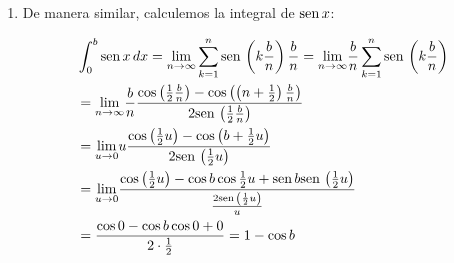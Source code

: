 \begin{enumerate}[leftmargin=1.2em,   itemindent=0pt,       labelwidth=\labelwidth,labelsep=0.5em,]
{\small
\begin{align*}
&=\underset{u\rightarrow 0}{\lim }u\frac{\sen\left( b+\frac{1}{2}u\right)
-\sen\left( \frac{1}{2}u\right) }{2\sen\left( \frac{1}{2}u\right) }\\&
=\underset{u\rightarrow 0}{\lim }\frac{\sen b\cos \frac{1}{2}u+\sen\frac{1}{2}u\cos b-\sen\left( \frac{1}{2}u\right) }{\frac{2\sen\left( \frac{1}{2}u\right)
}{u}}\\
&=\underset{u\rightarrow 0}{\lim }\frac{\sen b\cos 0+0-0}{2\cdot \frac{1}{2}}=\sen b
\end{align*}
}
Ahora,
\[
\scalebox{0.8}{$
	\int_a^b\!\cos x\,dx = \int_a^0\!\cos x\,dx + \int_0^b\!\cos x\,dx = \int_0^b\!\cos x\,dx - \int_0^a\!\cos x\,dx = \sen b - \sen a
	$}
\]

y así,

{\small
\begin{equation}\label{cos}
\text{\fbox{$\displaystyle{\int_{a}^{b}\cos x\,dx=\sen b-\sen a}$}}
\end{equation}
}


\item De manera similar, calculemos la integral de $\text{\rm sen}\, x$:

\begin{center}
\begin{minipage}{0.97\textwidth}
\begin{align*}
&\int_{0}^{b}\text{\rm sen}\, x\, dx=\underset{n\rightarrow \infty }{\lim }\sum\limits_{k=1}^{n}\text{\rm sen}\, \left( k\frac{b}{n}\right) \frac{b}{n}
=\underset{n\rightarrow \infty }{\lim }\frac{b}{n}\sum\limits_{k=1}^{n}
\text{\rm sen}\, \left( k\frac{b}{n}\right)\\
&=\underset{n\rightarrow \infty }{\lim }\frac{b}{n}\frac{\cos \left( \frac{1}{2}\frac{b}{n}\right) -\cos \left( \left( n+\frac{1}{2}\right) \frac{b}{n}\right) }{2\text{\rm sen}\,\left( \frac{1}{2}\frac{b}{n}\right)}\\
&=\underset{u\rightarrow 0}{\lim }u\frac{\cos \left( \frac{1}{2}u\right)
-\cos \left( b+\frac{1}{2}u\right) }{2\text{\rm sen}\,\left( \frac{1}{2}u\right) }\\
&=\underset{u\rightarrow 0}{\lim }\frac{\cos \left( \frac{1}{2}u\right)
-\cos b\cos \frac{1}{2}u+\text{\rm sen}\, b\text{\rm sen}\, \left( \frac{1}{2}u\right) }{\frac{
2\text{\rm sen}\,\left( \frac{1}{2}u\right) }{u}}\\
&=\frac{\cos 0-\cos b\cos 0+0}{2\cdot \frac{1}{2}}=1-\cos b
\end{align*}
\end{minipage}
\end{center}


\end{enumerate}
